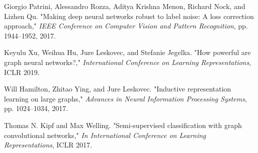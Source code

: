 \documentclass[portrait,final,archD,fontscale=0.477]{baposter}
\begin{document}
\begin{poster}
{\begin{thebibliography}{1}
 Giorgio Patrini, Alessandro Rozza, 
Aditya Krishna Menon, Richard Nock, and Lizhen Qu. "Making
deep neural networks robust to label noise: A loss correction approach,"
\textit{IEEE Conference on Computer Vision and Pattern Recognition}, pp.
1944–1952, 2017.

 Keyulu Xu, Weihua Hu, Jure Leskovec, and 
Stefanie Jegelka. "How powerful are graph neural
networks?," \textit{International Conference on Learning Representations}, 
ICLR 2019.

 Will Hamilton, Zhitao Ying, and Jure Leskovec.
"Inductive representation learning on large graphs,"
\textit{Advances in Neural Information Processing Systems}, pp. 1024–1034, 2017.

 Thomas N. Kipf and Max Welling. "Semi-supervised
classification with graph convolutional networks," \textit{In International
Conference on Learning Representations}, ICLR 2017.

      \end{thebibliography}
   \vspace{0.05em}
}

\end{poster}
\end{document}
